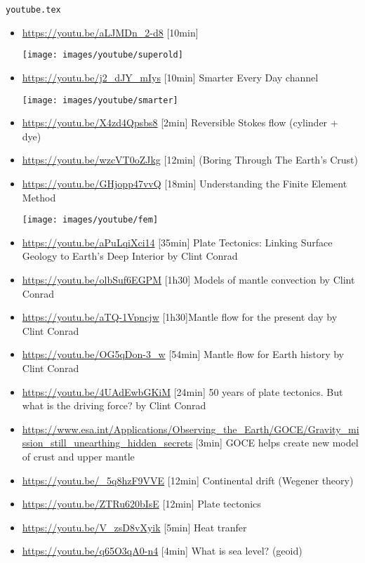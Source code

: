 \begin{flushright} {\tiny {\color{gray} \tt youtube.tex}} \end{flushright}

\begin{itemize}
\item \url{https://youtu.be/aLJMDn_2-d8} [10min]
\begin{center}
\texttt{[image: images/youtube/superold]}\\
\end{center}

\item \url{https://youtu.be/j2_dJY_mIys} [10min] Smarter Every Day channel
\begin{center}
\texttt{[image: images/youtube/smarter]}\\
\end{center}

\item \url{https://youtu.be/X4zd4Qpsbs8} [2min] Reversible Stokes flow (cylinder + dye)
\item \url{https://youtu.be/wzcVT0oZJkg} [12min] (Boring Through The Earth's Crust)
\item \url{https://youtu.be/GHjopp47vvQ} [18min] Understanding the Finite Element Method
\begin{center}
\texttt{[image: images/youtube/fem]}\\
\end{center}
\item \url{https://youtu.be/aPuLqiXci14} [35min] Plate Tectonics: Linking Surface Geology to Earth’s Deep Interior by Clint Conrad 
\item \url{https://youtu.be/olbSuf6EGPM} [1h30] Models of mantle convection by Clint Conrad 
\item \url{https://youtu.be/aTQ-1Vpncjw} [1h30]Mantle flow for the present day by Clint Conrad 
\item \url{https://youtu.be/OG5qDon-3_w} [54min] Mantle flow for Earth history by Clint Conrad 
\item \url{https://youtu.be/4UAdEwbGKiM} [24min] 50 years of plate tectonics. But what is the driving force? by Clint Conrad
\item \url{https://www.esa.int/Applications/Observing_the_Earth/GOCE/Gravity_mission_still_unearthing_hidden_secrets} [3min] GOCE helps create new model of crust and upper mantle
\item \url{https://youtu.be/_5q8hzF9VVE} [12min] Continental drift (Wegener theory) 
\item \url{https://youtu.be/ZTRu620bIsE} [12min] Plate tectonics
\item \url{https://youtu.be/V_zsD8vXyik} [5min] Heat tranfer 
\item \url{https://youtu.be/q65O3qA0-n4} [4min] What is sea level? (geoid) 

\end{itemize}

